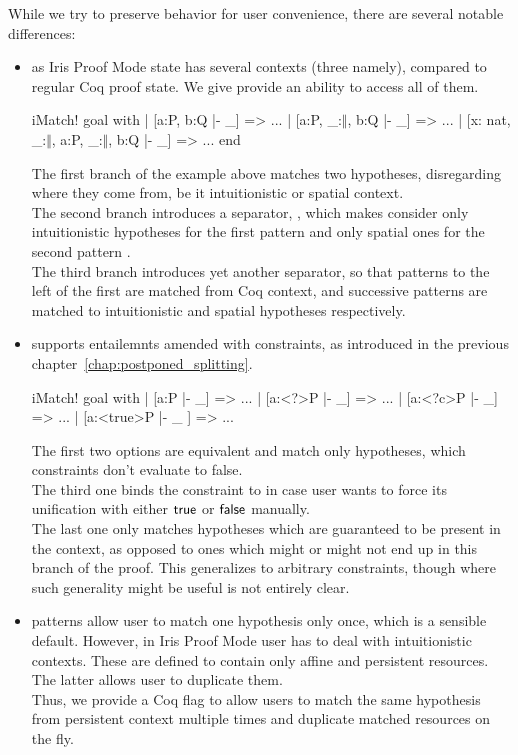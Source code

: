While we try to preserve  behavior for user convenience, there are several notable differences:
\begin{itemize}
\item as Iris Proof Mode state has several contexts (three namely), compared to regular Coq proof state.
  We give provide an ability to access all of them.
\begin{coq}
iMatch! goal with
| [a:P, b:Q |- _] => ...
| [a:P, _:$\Vert$, b:Q |- _] => ...
| [x: nat, _:$\Vert$, a:P, _:$\Vert$, b:Q |- _] => ...
end
\end{coq}
  The first branch of the example above matches two hypotheses, disregarding where they come from, be it intuitionistic or spatial context.\\
  The second branch introduces a separator, \coqe{_:$\Vert$}, which makes  consider only intuitionistic hypotheses for the first pattern  and only spatial ones for the second pattern .\\
  The third branch introduces yet another separator, so that patterns to the left of the first \coqe{_:$\Vert$} are matched from Coq context, and successive patterns are matched to intuitionistic and spatial hypotheses respectively.

\item {} supports entailemnts amended with constraints, as introduced in the previous chapter~\ref{chap:postponed_splitting}.
\begin{coq}
iMatch! goal with
| [a:P |- _] => ...
| [a:<?>P |- _] => ...
| [a:<?c>P |- _] => ...
| [a:<true>P |- _ ] => ...
\end{coq}
  The first two options are equivalent and match only hypotheses, which constraints don't evaluate to false.\\
  The third one binds the constraint to  in case user wants to force its unification with either $\textsf{true}$ or $\textsf{false}$ manually.\\
  The last one only matches hypotheses which are guaranteed to be present in the context, as opposed to ones which might or might not end up in this branch of the proof.
  This generalizes to arbitrary constraints, though where such generality might be useful is not entirely clear.
\item {} patterns allow user to match one hypothesis only once, which is a sensible default.
  However, in Iris Proof Mode user has to deal with intuitionistic contexts.
  These are defined to contain only affine and persistent resources.
  The latter allows user to duplicate them.\\
  Thus, we provide a Coq flag to allow users to match the same hypothesis from persistent context multiple times and duplicate matched resources on the fly.


\end{itemize}
